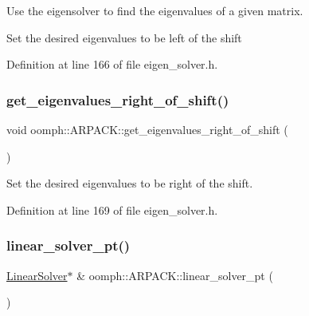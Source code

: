 Use the eigensolver to find the eigenvalues of a given matrix. 

Set the desired eigenvalues to be left of the shift 

Definition at line 166 of file eigen\+\_\+solver.\+h.

\mbox{\label{classoomph_1_1ARPACK_a177485cda9de5e207917adfdd6c6cdbb}} 
\subsubsection{\texorpdfstring{get\+\_\+eigenvalues\+\_\+right\+\_\+of\+\_\+shift()}{get\_eigenvalues\_right\_of\_shift()}}
{\footnotesize\ttfamily void oomph\+::\+A\+R\+P\+A\+C\+K\+::get\+\_\+eigenvalues\+\_\+right\+\_\+of\+\_\+shift (\begin{DoxyParamCaption}{ }\end{DoxyParamCaption})\hspace{0.3cm}{\ttfamily [inline]}}



Set the desired eigenvalues to be right of the shift. 



Definition at line 169 of file eigen\+\_\+solver.\+h.

\mbox{\label{classoomph_1_1ARPACK_a2118c6975be7d72dada95331201d518a}} 
\subsubsection{\texorpdfstring{linear\+\_\+solver\+\_\+pt()}{linear\_solver\_pt()}\hspace{0.1cm}{\footnotesize\ttfamily [1/2]}}
{\footnotesize\ttfamily \hyperlink{classoomph_1_1LinearSolver}{Linear\+Solver}$\ast$ \& oomph\+::\+A\+R\+P\+A\+C\+K\+::linear\+\_\+solver\+\_\+pt (\begin{DoxyParamCaption}{ }\end{DoxyParamCaption})\hspace{0.3cm}{\ttfamily [inline]}}



